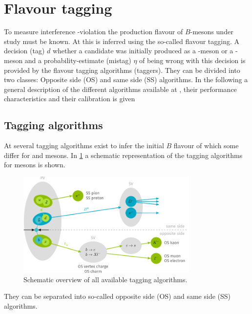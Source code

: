 \section{Flavour tagging}
\label{sec:flavourtagging}

To measure interference \CP-violation the production flavour of $B$-mesons under study must be known.
At \lhcb this is inferred using the so-called flavour tagging.
A decision (tag) $d$ whether a \B candidate was initially produced as a \Bz-meson or a \Bzb-meson and a probability-estimate (mistag) $\eta$ of being wrong with this decision is provided by the flavour tagging algorithms (taggers).
They can be divided into two classes: Opposite side (OS) and same side (SS) algorithms.
In the following a general description of the different algorithms available at \lhcb, their performance characteristics and their calibration is given

\subsection{Tagging algorithms}
\label{sec:taggingalgorithms}

At \lhcb several tagging algorithms exist to infer the initial $B$ flavour of which some differ for \Bz and \Bs mesons.
In \cref{fig:taggingalgorithms} a schematic representation of the tagging algorithms for \Bz mesons is shown.
\begin{figure}[tbp]
    \centering
    \includegraphics[width=0.8\textwidth]{09FlavourTagging/figs/FTscheme.pdf}
    \caption{Schematic overview of all available \Bz tagging algorithms.}
    \label{fig:taggingalgorithms}
\end{figure}
They can be separated into so-called opposite side (OS) and same side (SS) algorithms.

